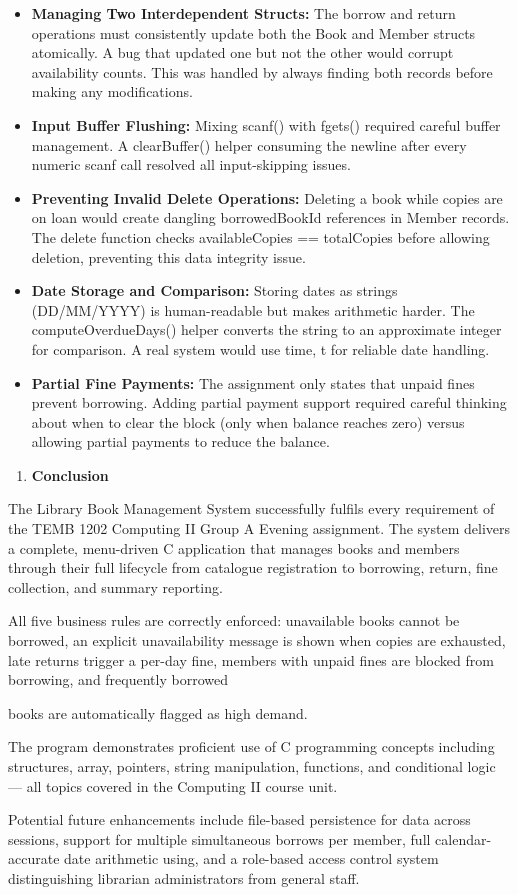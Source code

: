 \documentclass[
]{article}
\begin{document}
\begin{itemize}
\item
  \textbf{Managing Two Interdependent Structs:} The borrow and return
  operations must consistently update both the Book and Member structs
  atomically. A bug that updated one but not the other would corrupt
  availability counts. This was handled by always finding both records
  before making any modifications.
\item
  \textbf{Input Buffer Flushing:} Mixing scanf() with fgets() required
  careful buffer management. A clearBuffer() helper consuming the
  newline after every numeric scanf call resolved all input-skipping
  issues.
\item
  \textbf{Preventing Invalid Delete Operations:} Deleting a book while
  copies are on loan would create dangling borrowedBookId references in
  Member records. The delete function checks availableCopies ==
  totalCopies before allowing deletion, preventing this data integrity
  issue.
\item
  \textbf{Date Storage and Comparison:} Storing dates as strings
  (DD/MM/YYYY) is human-readable but makes arithmetic harder. The
  computeOverdueDays() helper converts the string to an approximate
  integer for comparison. A real system would use time, t for reliable
  date handling.
\item
  \textbf{Partial Fine Payments:} The assignment only states that unpaid
  fines prevent borrowing. Adding partial payment support required
  careful thinking about when to clear the block (only when balance
  reaches zero) versus allowing partial payments to reduce the balance.
\end{itemize}

\begin{enumerate}
\def\labelenumi{\arabic{enumi}.}
\setcounter{enumi}{7}
\item
  \textbf{Conclusion}
\end{enumerate}

The Library Book Management System successfully fulfils every
requirement of the TEMB 1202 Computing II Group A Evening assignment.
The system delivers a complete, menu-driven C application that manages
books and members through their full lifecycle from catalogue
registration to borrowing, return, fine collection, and summary
reporting.

All five business rules are correctly enforced: unavailable books cannot
be borrowed, an explicit unavailability message is shown when copies are
exhausted, late returns trigger a per-day fine, members with unpaid
fines are blocked from borrowing, and frequently borrowed

books are automatically flagged as high demand.

The program demonstrates proficient use of C programming concepts
including structures, array, pointers, string manipulation, functions,
and conditional logic --- all topics covered in the Computing II course
unit.

Potential future enhancements include file-based persistence for data
across sessions, support for multiple simultaneous borrows per member,
full calendar-accurate date arithmetic using, and a role-based access
control system distinguishing librarian administrators from general
staff.
\end{document}

